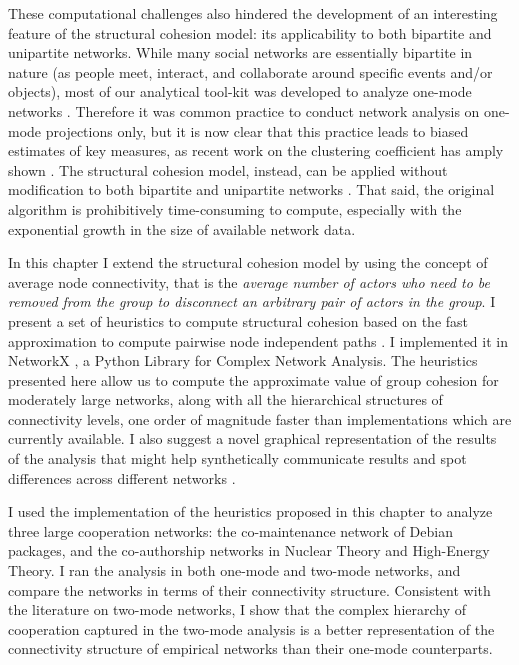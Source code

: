 These computational challenges also hindered the development of an interesting feature of the structural cohesion model: its applicability to both bipartite and unipartite networks. While many social networks are essentially bipartite in nature (as people meet, interact, and collaborate around specific events and/or objects), most of our analytical tool-kit was developed to analyze one-mode networks \citep*{latapy:2008}. Therefore it was common practice to conduct network analysis on one-mode projections only, but it is now clear that this practice leads to biased estimates of key measures, as recent work on the clustering coefficient has amply shown \citep{robins:2004,lind:2005,latapy:2008}. The structural cohesion model, instead, can be applied without modification to both bipartite and unipartite networks \citep*{white:2004}. That said, the original algorithm is prohibitively time-consuming to compute, especially with the exponential growth in the size of available network data. 

In this chapter I extend the structural cohesion model by using the concept of average node connectivity, that is the \emph{average number of actors who need to be removed from the group to disconnect an arbitrary pair of actors in  the group}. I present a set of heuristics to compute structural cohesion based on the fast approximation to compute pairwise node independent paths \citep{white:2001b}. I implemented it in NetworkX \citep{hagberg:2008}, a Python Library for Complex Network Analysis. The heuristics presented here allow us to compute the approximate value of group cohesion for moderately large networks, along with all the hierarchical structures of connectivity levels, one order of magnitude faster than implementations which are currently available. I also suggest a novel graphical representation of the results of the analysis that might help synthetically communicate results and spot differences across different networks \citep*{moody:2005}.

I used the implementation of the heuristics proposed in this chapter to analyze three large cooperation networks: the co-maintenance network of Debian packages, and the co-authorship networks in Nuclear Theory and High-Energy Theory. I ran the analysis in both one-mode and two-mode networks, and compare the networks in terms of their connectivity structure. Consistent with the literature on two-mode networks, I show that the complex hierarchy of cooperation captured in the two-mode analysis is a better representation of the connectivity structure of empirical networks than their one-mode counterparts.

